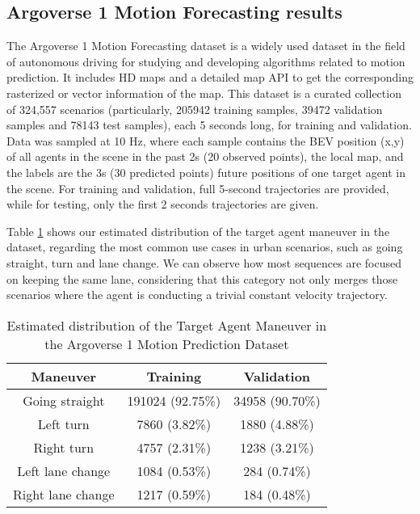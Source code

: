 \subsection{Argoverse 1 Motion Forecasting results}
\label{subsec:2_argoverse_1}

The Argoverse 1 Motion Forecasting dataset is a widely used dataset in the field of autonomous driving for studying and developing algorithms related to motion prediction. It includes HD maps and a detailed map API to get the corresponding rasterized or vector information of the map. This dataset is a curated collection of 324,557 scenarios (particularly, 205942 training samples, 39472 validation samples and 78143 test samples), each 5 seconds long, for training and validation. Data was sampled at 10 Hz, where each sample contains the \ac{BEV} position (x,y) of all agents in the scene in the past 2s (20 observed points), the local map, and the labels are the 3s (30 predicted points) future positions of one target agent in the scene. For training and validation, full 5-second trajectories are provided, while for testing, only the first 2 seconds trajectories are given. 

Table \ref{table:2_argoverse1_maneuvers_distribution} shows our estimated distribution of the target agent maneuver in the dataset, regarding the most common use cases in urban scenarios, such as going straight, turn and lane change. We can observe how most sequences are focused on keeping the same lane, considering that this category not only merges those scenarios where the agent is conducting a trivial constant velocity trajectory.

\begin{table}[!tpbh]
	\centering
	\caption{Estimated distribution of the Target Agent Maneuver in the Argoverse 1 Motion Prediction Dataset} 
	\label{table:2_argoverse1_maneuvers_distribution}
	\begin{tabular}{c|c|c}
		\hline
		Maneuver & Training  & Validation\\
		\hline
		Going straight & 191024 (92.75\%) & 34958 (90.70\%) \\
		Left turn & 7860 (3.82\%) & 1880 (4.88\%) \\
		Right turn & 4757 (2.31\%) & 1238 (3.21\%) \\
		Left lane change & 1084 (0.53\%) & 284 (0.74\%) \\
		Right lane change & 1217 (0.59\%) & 184 (0.48\%) \\
		\hline
	\end{tabular}
\end{table}   

